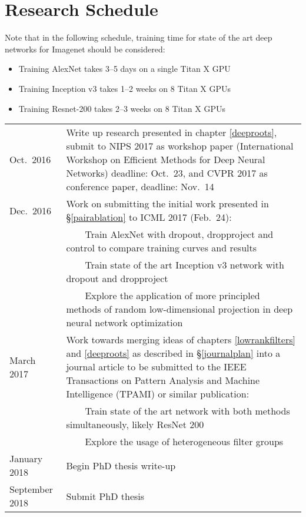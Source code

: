 \documentclass[thesis]{subfiles}
\begin{document}
\section{Research Schedule}
Note that in the following schedule, training time for state of the art deep networks for Imagenet should be considered:
\newcommand{\tabitem}{~~\llap{\textbullet}~~}
\begin{itemize}
\item Training AlexNet takes 3--5 days on a single Titan X GPU
\item Training Inception v3 takes 1--2 weeks on 8 Titan X GPUs
\item Training Resnet-200 takes 2--3 weeks on 8 Titan X GPUs
\end{itemize}


\begin{tabularx}{\textwidth}{lX}
\toprule
Oct.\ 2016 &  Write up research presented in chapter \ref{deeproots}, submit to NIPS 2017 as workshop paper (International Workshop on Efficient Methods for Deep Neural Networks) deadline: Oct.\ 23, and CVPR 2017 as conference paper, deadline: Nov.\ 14\\
Dec.\ 2016 &  Work on submitting the initial work presented in \S\ref{pairablation} to ICML 2017 (Feb.\ 24):\\
& \tabitem Train AlexNet with dropout, dropproject and control to compare training curves and results\\
& \tabitem Train state of the art Inception v3 network with dropout and dropproject\\
& \tabitem Explore the application of more principled methods of random low-dimensional projection in deep neural network optimization\\
March 2017& Work towards merging ideas of chapters \ref{lowrankfilters} and \ref{deeproots} as described in \S\ref{journalplan} into a journal article to be submitted to the IEEE Transactions on Pattern Analysis and Machine Intelligence (TPAMI) or similar publication:\\
& \tabitem Train state of the art network with both methods simultaneously, likely ResNet 200\\
& \tabitem Explore the usage of heterogeneous filter groups\\
January 2018 & Begin PhD thesis write-up\\
September 2018 & Submit PhD thesis\\
\bottomrule
\end{tabularx} 
\end{document}
